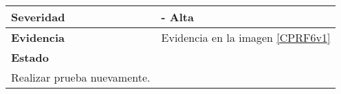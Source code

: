 \begin{longtable}{|l|l|}
\textbf{Severidad}                                                                      &   \textbf{- Alta}                                                                                                                                                                                                                                                                \\ \hline
\textbf{Evidencia}                                                                      &      Evidencia en la imagen \ref{CPRF6v1}                                                                                                                                                                                                                                                                    \\ \hline
\textbf{Estado}                                                                         & \begin{tabular}[c]{@{}l@{}}
Iniciado.\\ Realizar prueba nuevamente.
\end{tabular}                                                                                                                                                                                                                                                            \\ \hline
\end{longtable}